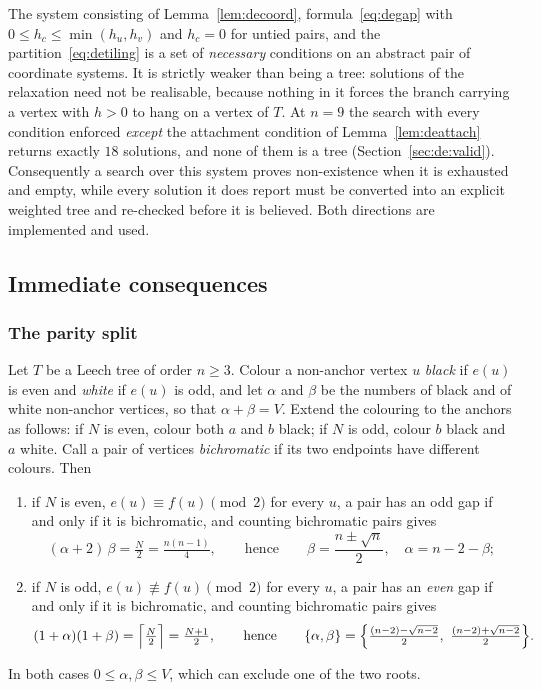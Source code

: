 \begin{remark}\label{rem:derelax}
The system consisting of Lemma~\ref{lem:decoord}, formula~\eqref{eq:degap} with
$0\le h_c\le\min(h_u,h_v)$ and $h_c=0$ for untied pairs, and the
partition~\eqref{eq:detiling} is a set of \emph{necessary} conditions on an
abstract pair of coordinate systems.  It is strictly weaker than being a tree:
solutions of the relaxation need not be realisable, because nothing in it
forces the branch carrying a vertex with $h>0$ to hang on a vertex of $T$.  At
$n=9$ the search with every condition enforced \emph{except} the attachment
condition of Lemma~\ref{lem:deattach} returns exactly $18$ solutions, and none
of them is a tree (Section~\ref{sec:de:valid}).  Consequently a search over
this system proves non-existence when it is exhausted and empty, while every
solution it does report must be converted into an explicit weighted tree and
re-checked before it is believed.  Both directions are implemented and used.
\end{remark}

\subsection{Immediate consequences}\label{sec:de:cons}

\subsubsection*{The parity split}

\begin{proposition}\label{prop:desplit}
Let $T$ be a Leech tree of order $n\ge3$.  Colour a non-anchor vertex $u$
\emph{black} if $e(u)$ is even and \emph{white} if $e(u)$ is odd, and let
$\alpha$ and $\beta$ be the numbers of black and of white non-anchor vertices,
so that $\alpha+\beta=V$.  Extend the colouring to the anchors as follows:
if $N$ is even, colour both $a$ and $b$ black; if $N$ is odd, colour $b$ black
and $a$ white.  Call a pair of vertices \emph{bichromatic} if its two endpoints
have different colours.  Then
\begin{enumerate}
\item[(a)] if $N$ is even, $e(u)\equiv f(u)\pmod2$ for every $u$, a pair has an
odd gap if and only if it is bichromatic, and counting bichromatic pairs gives
\[
  (\alpha+2)\,\beta=\tfrac N2=\tfrac{n(n-1)}4,
  \qquad\text{hence}\qquad
  \beta=\frac{n\pm\sqrt n}2,\quad \alpha=n-2-\beta ;
\]
\item[(b)] if $N$ is odd, $e(u)\not\equiv f(u)\pmod2$ for every $u$, a pair has
an \emph{even} gap if and only if it is bichromatic, and counting bichromatic
pairs gives
\[
  (1+\alpha)(1+\beta)=\Bigl\lceil\tfrac N2\Bigr\rceil=\tfrac{N+1}2,
  \qquad\text{hence}\qquad
  \{\alpha,\beta\}=\Bigl\{\tfrac{(n-2)-\sqrt{n-2}}2,\ \tfrac{(n-2)+\sqrt{n-2}}2\Bigr\}.
\]
\end{enumerate}
In both cases $0\le\alpha,\beta\le V$, which can exclude one of the two roots.
\end{proposition}

